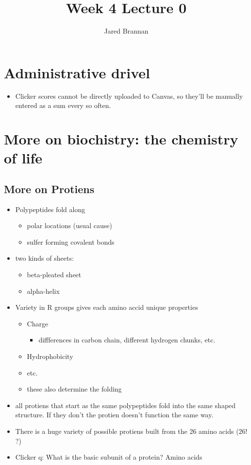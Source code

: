\documentclass{article}
\title{Week 4 Lecture 0}
\author{Jared Brannan }
\theoremstyle{definition}
\begin{document}
\maketitle

\section{Administrative drivel}
\begin{itemize}
	\item Clicker scores cannot be directly uploaded to Canvas, so they'll be manually entered as a sum every so often.
\end{itemize}

\section{More on biochistry: the chemistry of life}
\subsection{More on Protiens}
\begin{itemize}
	\item  Polypeptides fold along
		\begin{itemize}
			\item polar locations (usual cause)
			\item sulfer forming covalent bonds
		\end{itemize}
	\item two kinds of sheets:
		\begin{itemize}
			\item beta-pleated sheet
			\item alpha-helix
		\end{itemize}
	\item Variety in R groups gives each amino accid unique properties
		\begin{itemize}
			\item  Charge
				\begin{itemize}
					\item diffferences in carbon chain, different hydrogen chunks, etc.
				\end{itemize}
			\item Hydrophobicity
			\item etc.
			\item these also determine the folding
		\end{itemize}
	\item all protiens that start as the same polypeptides fold into the same shaped structure. If they don't the protien doesn't function the same way.
	\item There is a huge variety of possible protiens built from the 26 amino acids ($26!$ ?)
	\item Clicker q: What is the basic subunit of a protein? Amino acids
\end{itemize}
\end{document}
